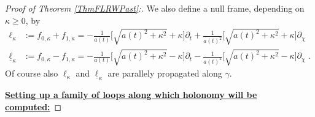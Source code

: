 \documentclass[reqno]{article}
\begin{document}
\begin{proof}[Proof of Theorem \ref{ThmFLRWPast}:]
We also define a null frame, depending on $\kappa \geq 0$, by
\begin{equation}
\label{EqDefNullFrame}
\begin{split}
\ell_\kappa &:= f_{0,\kappa} + f_{1, \kappa} =-\frac{1}{a(t)} \big[ \sqrt{a(t)^2 + \kappa^2} + \kappa\big] \partial_t + \frac{1}{a(t)^2} \big[\sqrt{a(t)^2 + \kappa^2} + \kappa\big] \partial_\chi \\
\underline{\ell}_\kappa &:= f_{0,\kappa} - f_{1, \kappa} =-\frac{1}{a(t)} \big[ \sqrt{a(t)^2 + \kappa^2} - \kappa\big] \partial_t - \frac{1}{a(t)^2} \big[\sqrt{a(t)^2 + \kappa^2} - \kappa\big] \partial_\chi \;.
\end{split}
\end{equation}
Of course also $\ell_\kappa$ and $\underline{\ell}_\kappa$ are parallely propagated along $\gamma$.


\underline{\textbf{Setting up a family of loops along which holonomy will be computed:}}


\end{proof}
\end{document}
